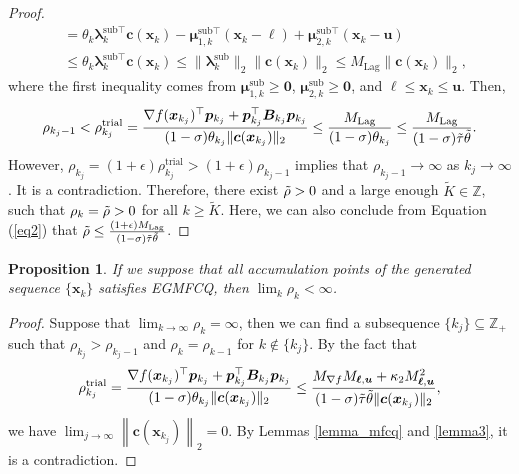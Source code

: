 \documentclass[aos]{imsart}
\numberwithin{equation}{section}
\theoremstyle{plain}
\newtheorem{proposition}{Proposition}
\begin{document}
\begin{appendix}
\begin{proof}
\begin{equation*}
\begin{split}
        & = \theta_k \bm{\lambda}_k^{\text{sub} \top} \bm{c}(\bm{x}_{k}) - \bm{\mu}_{1,k}^{\text{sub} \top}(\bm{x}_k  - \bm{\ell}) + \bm{\mu}_{2,k}^{\text{sub} \top}(\bm{x}_k  - \bm{u})\\
        & \leq \theta_k \bm{\lambda}_k^{\text{sub} \top} \bm{c}(\bm{x}_{k}) \leq \|\bm{\lambda}_k^{\text{sub}}\|_{2} \|\bm{c}(\bm{x}_{k})\|_2 \leq M_{\text{Lag}}\|\bm{c}(\bm{x}_{k})\|_2,
     \end{split}
     \end{equation*}
     where the first inequality comes from $\bm{\mu}_{1,k}^{\text{sub}} \geq \bm{0}$, $\bm{\mu}_{2,k}^{\text{sub}} \geq \bm{0}$, and $\bm{\ell} \leq \bm{x}_k \leq \bm{u}$. Then, 
     \begin{equation}
     \label{eq2}
         \rho_{k_j-1} < \rho_{k_j}^{\text{trial}} = \frac{\nabla f(\bm{x}_{k_j})^{\top} \bm{p}_{k_j} + \bm{p}_{k_j}^{\top} \bm{B}_{k_j} \bm{p}_{k_j}}{(1-\sigma)\theta_{k_j} \|\bm{c}(\bm{x}_{k_j})\|_2} \leq \frac{M_{\text{Lag}}}{(1-\sigma)\theta_{k_j}} \leq \frac{M_{\text{Lag}}}{(1-\sigma)\Tilde{\tau} \Tilde{\theta}}.
     \end{equation}
     However, $\rho_{k_j} = (1+\epsilon) \rho_{k_j}^{\text{trial}} > (1+\epsilon) \rho_{k_j-1}$ implies that $\rho_{k_j-1} \to \infty$ as $k_j \to \infty$. It is a contradiction. Therefore, there exist $\Tilde{\rho}>0$ and a large enough $\widetilde{K} \in \mathbb{Z}$, such that $\rho_k = \Tilde{\rho} > 0$ for all $k 
     \geq \widetilde{K}$. Here, we can also conclude from Equation (\ref{eq2}) that  $\Tilde{\rho} \leq \frac{(1+\epsilon)M_{\text{Lag}}}{(1-\sigma)\Tilde{\tau} \Tilde{\theta}}$.  
 \end{proof}



\begin{proposition}
\label{prop_bound_penalty}
     If we suppose that all accumulation points of the generated sequence $\{\bm{x}_{k}\}$ satisfies EGMFCQ, then $\lim_{k} \rho_k < \infty$. 
 \end{proposition}

 \begin{proof}
     Suppose that $\lim_{k \to \infty} \rho_{k} = \infty$, then we can find a subsequence $\{k_j\} \subseteq \mathbb{Z}_{+}$ such that $\rho_{k_j} > \rho_{k_j - 1}$ and $\rho_k = \rho_{k-1}$ for $k \notin \{k_j\}$. By the fact that 
     \begin{equation*}
         \rho_{k_j}^{\text{trial}} = \frac{\nabla f(\bm{x}_{k_j})^{\top} \bm{p}_{k_j} + \bm{p}_{k_j}^{\top} \bm{B}_{k_j} \bm{p}_{k_j}}{(1-\sigma)\theta_{k_j} \|\bm{c}(\bm{x}_{k_j})\|_2} \leq \frac{M_{\nabla f} M_{\bm{\ell},\bm{u}} + \kappa_2 M_{\bm{\ell},\bm{u}}^2 }{(1-\sigma) \Tilde{\tau} \Tilde{\theta} \|\bm{c}(\bm{x}_{k_j})\|_2},
     \end{equation*}
     we have $\lim_{j \to \infty} \left\| \bm{c}(\bm{x}_{k_j}) \right\|_2 = 0$. By Lemmas \ref{lemma_mfcq} and \ref{lemma3}, it is a contradiction. 
 \end{proof}



\end{appendix}
\end{document}
